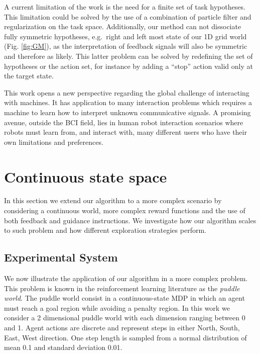 A current limitation of the work is the need for a finite set of task hypotheses. This limitation could be solved by the use of a combination of particle filter and regularization on the task space. Additionally, our method can not dissociate fully symmetric hypotheses, e.g.\ right and left most state of our 1D grid world (Fig. \ref{fig:GM}), as the interpretation of feedback signals will also be symmetric and therefore as likely. This latter problem can be solved by redefining the set of hypotheses or the action set, for instance by adding a ``stop'' action valid only at the target state.

This work opens a new perspective regarding the global challenge of interacting with machines. It has application to many interaction problems which requires a machine to learn how to interpret unknown communicative signals. A promising avenue, outside the BCI field, lies in human robot interaction scenarios where robots must learn from, and interact with, many different users who have their own limitations and preferences.




\section{Continuous state space}


In this section we extend our algorithm to a more complex scenario by considering a continuous world, more complex reward functions and the use of both feedback and guidance instructions. We investigate how our algorithm scales to such problem and how different exploration strategies perform.

\subsection{Experimental System}

We now illustrate the application of our algorithm in a more complex problem. This problem is known in the reinforcement learning literature as the \emph{puddle world}. The puddle world consist in a continuous-state MDP in which an agent must reach a goal region while avoiding a penalty region.
% 
In this work we consider a 2 dimensional puddle world with each dimension ranging between 0 and 1. Agent actions are discrete and represent steps in either North, South, East, West direction. One step length is sampled from a normal distribution of mean 0.1 and standard deviation 0.01.


